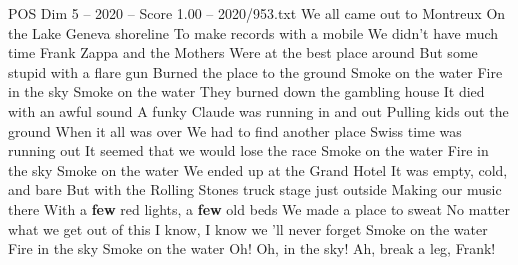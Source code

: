 \begin{textsample}{POS Dim 5 – 2020 – Score 1.00 – 2020/953.txt}  \label{ex:f5_pos_023}
We all came out to Montreux On the Lake Geneva shoreline To make records with a mobile We didn't have much time Frank Zappa and the Mothers Were at the best place around But some stupid with a flare gun Burned the place to the ground Smoke on the water Fire in the sky Smoke on the water They burned down the gambling house It died with an awful sound A funky Claude was running in and out Pulling kids out the ground When it all was over We had to find another place Swiss time was running out It seemed that we would lose the race Smoke on the water Fire in the sky Smoke on the water We ended up at the Grand Hotel It was empty, cold, and bare But with the Rolling Stones truck stage just outside Making our music there With a \textbf{few} red lights, a \textbf{few} old beds We made a place to sweat No matter what we get out of this I know, I know we 'll never forget Smoke on the water Fire in the sky Smoke on the water Oh!
Oh, in the sky!
Ah, break a leg, Frank!

\end{textsample}
